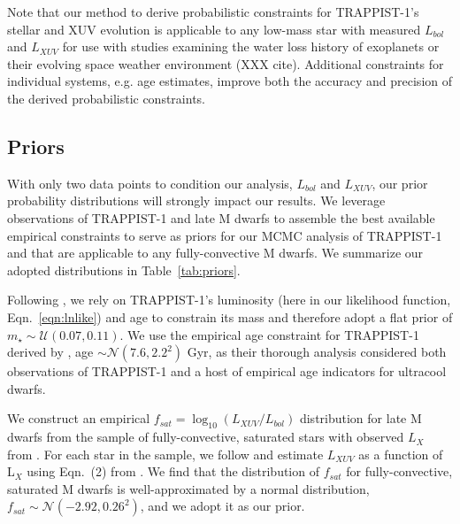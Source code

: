 \documentclass[twocolumn]{aastex62}
\begin{document}
Note that our method to derive probabilistic constraints for TRAPPIST-1's stellar and XUV evolution is applicable to any low-mass star with measured $L_{bol}$ and $L_{XUV}$ for use with studies examining the water loss history of exoplanets or their evolving space weather environment (XXX cite). Additional constraints for individual systems, e.g. age estimates, improve both the accuracy and precision of the derived probabilistic constraints.  

\subsection{Priors} \label{sec:mcmc:priors}

With only two data points to condition our analysis, $L_{bol}$ and $L_{XUV}$, our prior probability distributions will strongly impact our results. We leverage observations of TRAPPIST-1 and late M dwarfs to assemble the best available empirical constraints to serve as priors for our MCMC analysis of TRAPPIST-1 and that are applicable to any fully-convective M dwarfs. We summarize our adopted distributions in Table~\ref{tab:priors}.

Following \citet{vanGrootel2018}, we rely on TRAPPIST-1's luminosity (here in our likelihood function, Eqn.~\ref{eqn:lnlike}) and age to constrain its mass and therefore adopt a flat prior of $m_{\star} \sim \mathcal{U}(0.07, 0.11)$. We use the empirical age constraint for TRAPPIST-1 derived by \citet{Burgasser2017}, age $\sim \mathcal{N}(7.6, 2.2^2)$ Gyr, as their thorough analysis considered both observations of TRAPPIST-1 and a host of empirical age indicators for ultracool dwarfs. 

We construct an empirical $f_{sat} = \log_{10}(L_{XUV}/L_{bol})$ distribution for late M dwarfs from the sample of fully-convective, saturated stars with observed $L_{X}$ from \citet{Wright2011}. For each star in the \citet{Wright2011} sample, we follow \citet{Wheatley2017} and estimate $L_{XUV}$ as a function of L$_{X}$ using Eqn.~(2) from \citet{Chadney2015}. We find that the distribution of $f_{sat}$ for fully-convective, saturated M dwarfs is well-approximated by a normal distribution, $f_{sat} \sim \mathcal{N}(-2.92, 0.26^2)$, and we adopt it as our prior. 
\end{document}
